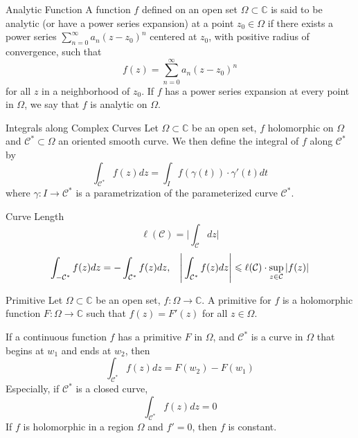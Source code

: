 \documentclass{beamer}
\begin{document}
\begin{frame}
\begin{block}{Analytic Function}
A function $f$ defined on an open set $\Omega\subset\mathbb{C}$ is said to be analytic (or have a power series expansion) at a point $z_0\in\Omega$ if there exists a power series $\sum\limits_{n=0}^{\infty}a_n(z-z_0)^n$ centered at $z_0$, with positive radius of convergence, such that
$$f(z)=\sum\limits_{n=0}^{\infty}a_n(z-z_0)^n$$
for all $z$ in a neighborhood of $z_0$. If $f$ has a power series expansion at every point in $\Omega$, we say that $f$ is analytic on $\Omega$.
\end{block}
\end{frame}

\begin{frame}
\begin{block}{Integrals along Complex Curves}
Let $\Omega\subset\mathbb{C}$ be an open set, $f$ holomorphic on $\Omega$ and $\mathcal{C}^*\subset\Omega$ an oriented smooth curve. We then define the integral of $f$ along $\mathcal{C}^* $ by 
$$\int_{\mathcal{C}^*}f(z)dz=\int_If(\gamma(t))\cdot\gamma'(t)dt$$
where $\gamma:I\rightarrow \mathcal{C}^* $ is a parametrization of the parameterized curve $\mathcal{C}^*$.
\end{block}
\begin{block}{Curve Length}
$$\ell(\mathcal{C})=\Bigg|\int_{\mathcal{C}}dz\Bigg|$$
$$\int_{-\mathcal{C}^*}f(z)dz=-\int_{\mathcal{C}^*}f(z)dz,\hspace{3mm}\Bigg|\int_{\mathcal{C}^*}f(z)dz\Bigg|\leqslant\ell(\mathcal{C})\cdot\sup_{z\in\mathcal{C}}|f(z)|$$
\end{block}
\end{frame}

\begin{frame}
\begin{block}{Primitive}
Let $\Omega\subset\mathbb{C}$ be an open set, $f:\Omega\rightarrow\mathbb{C}$. A primitive for $f$ is a holomorphic function $F:\Omega\rightarrow\mathbb{C}$ such that $f(z)=F'(z)$ for all $z\in\Omega$.
\end{block}

\begin{block}{}
If a continuous function $f$ has a primitive $F$ in $\Omega$, and $\mathcal{C}^*$ is a curve in $\Omega$ that begins at $w_1$ and ends at $w_2$, then
$$\int_{\mathcal{C}^*}f(z)dz=F(w_2)-F(w_1)$$
Especially, if $\mathcal{C}^*$ is a closed curve, 
$$\int_{\mathcal{C}^*}f(z)dz=0$$
If $f$ is holomorphic in a region $\Omega$ and $f'=0$, then $f$ is constant.
\end{block}
\end{frame}
\end{document}
